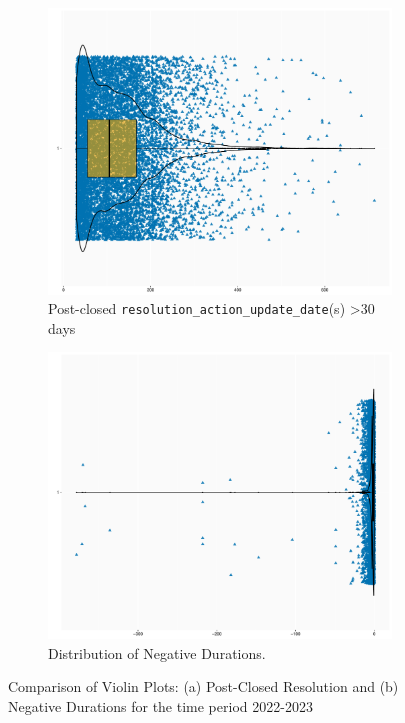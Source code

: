 \documentclass[linenumber]{jdsart}
\begin{document}
\begin{figure}[tbp]
  \centering
  \begin{subfigure}[t]{0.495\textwidth} %
    \centering
    \includegraphics[width=\textwidth]{post_closed_violin_chart.pdf}
    \caption{Post-closed \texttt{resolution\_action\_update\_date}(s) >30 days}
    \label{fig:resolution-violin}
  \end{subfigure}
  \hfill %
  \begin{subfigure}[t]{0.495\textwidth} %
    \centering
    \includegraphics[width=\textwidth]{negative_duration_SR_violin.pdf}
    \caption{Distribution of Negative Durations.}
    \label{fig:negative-duration-violin}
  \end{subfigure}
  \caption{Comparison of Violin Plots: (a) Post-Closed Resolution and (b) Negative Durations for the time period 2022-2023}
  \label{fig:violin-plots}
\end{figure}
\end{document}
